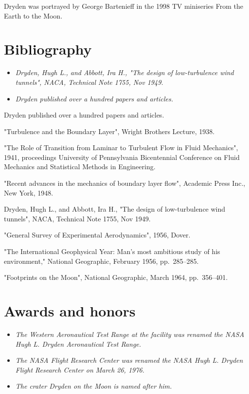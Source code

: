 Dryden was portrayed by George Bartenieff in the 1998 TV miniseries From
the Earth to the Moon.

\section{Bibliography}\label{bibliography}

\begin{itemize}
\item
  \emph{Dryden, Hugh L., and Abbott, Ira H., "The design of
  low-turbulence wind tunnels", NACA, Technical Note 1755, Nov 1949.}
\item
  \emph{Dryden published over a hundred papers and articles.}
\end{itemize}

Dryden published over a hundred papers and articles.

"Turbulence and the Boundary Layer", Wright Brothers Lecture, 1938.

"The Role of Transition from Laminar to Turbulent Flow in Fluid
Mechanics", 1941, proceedings University of Pennsylvania Bicentennial
Conference on Fluid Mechanics and Statistical Methods in Engineering.

"Recent advances in the mechanics of boundary layer flow", Academic
Press Inc., New York, 1948.

Dryden, Hugh L., and Abbott, Ira H., "The design of low-turbulence wind
tunnels", NACA, Technical Note 1755, Nov 1949.

"General Survey of Experimental Aerodynamics", 1956, Dover.

"The International Geophysical Year: Man's most ambitious study of his
environment," National Geographic, February 1956, pp.~285--285.

"Footprints on the Moon", National Geographic, March 1964, pp.~356--401.

\section{Awards and honors}\label{awards-and-honors}

\begin{itemize}
\item
  \emph{The Western Aeronautical Test Range at the facility was renamed
  the NASA Hugh L. Dryden Aeronautical Test Range.}
\item
  \emph{The NASA Flight Research Center was renamed the NASA Hugh L.
  Dryden Flight Research Center on March 26, 1976.}
\item
  \emph{The crater Dryden on the Moon is named after him.}
\end{itemize}

